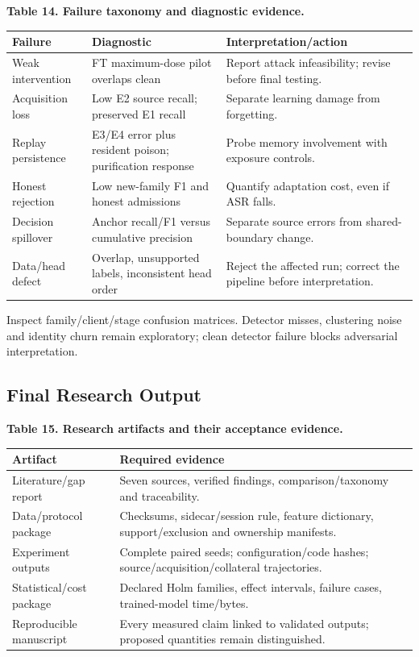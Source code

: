 \documentclass[10pt,a4paper]{article}
\begin{document}
\centering\footnotesize
\par\textbf{Table 14. Failure taxonomy and diagnostic evidence.}\par


\begin{longtable}{p{2.3cm}l l}
\toprule
Failure & Diagnostic & Interpretation/action\\
\midrule
Weak intervention & FT maximum-dose pilot overlaps clean & Report attack infeasibility; revise before final testing.\\
Acquisition loss & Low E2 source recall; preserved E1 recall & Separate learning damage from forgetting.\\
Replay persistence & E3/E4 error plus resident poison; purification response & Probe memory involvement with exposure controls.\\
Honest rejection & Low new-family F1 and honest admissions & Quantify adaptation cost, even if ASR falls.\\
Decision spillover & Anchor recall/F1 versus cumulative precision & Separate source errors from shared-boundary change.\\
Data/head defect & Overlap, unsupported labels, inconsistent head order & Reject the affected run; correct the pipeline before interpretation.\\
\bottomrule
\end{longtable}

Inspect family/client/stage confusion matrices. Detector misses, clustering noise and identity churn remain exploratory; clean detector failure blocks adversarial interpretation.

\subsection{Final Research Output}

\centering\footnotesize
\par\textbf{Table 15. Research artifacts and their acceptance evidence.}\par


\begin{longtable}{p{3.2cm}l}
\toprule
Artifact & Required evidence\\
\midrule
Literature/gap report & Seven sources, verified findings, comparison/taxonomy and traceability.\\
Data/protocol package & Checksums, sidecar/session rule, feature dictionary, support/exclusion and ownership manifests.\\
Experiment outputs & Complete paired seeds; configuration/code hashes; source/acquisition/collateral trajectories.\\
Statistical/cost package & Declared Holm families, effect intervals, failure cases, trained-model time/bytes.\\
Reproducible manuscript & Every measured claim linked to validated outputs; proposed quantities remain distinguished.\\
\bottomrule
\end{longtable}
\end{document}
